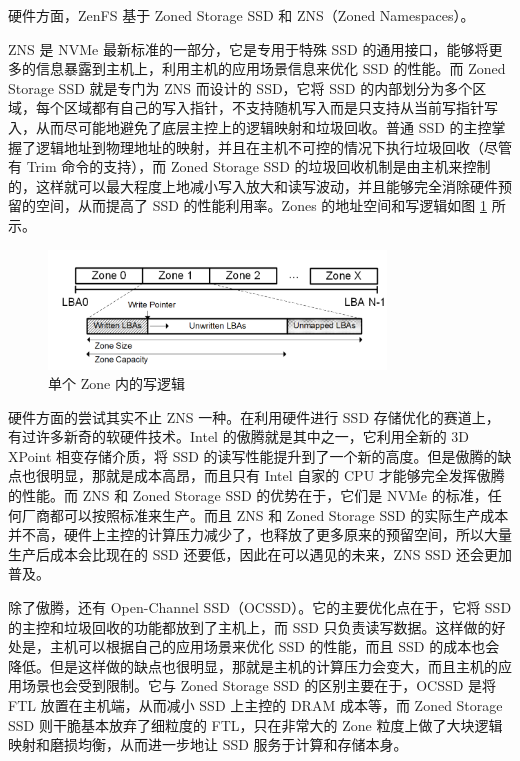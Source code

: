 硬件方面，ZenFS 基于 Zoned Storage SSD 和 ZNS（Zoned Namespaces）。

ZNS 是 NVMe 最新标准的一部分，它是专用于特殊 SSD 的通用接口，能够将更多的信息暴露到主机上，利用主机的应用场景信息来优化 SSD 的性能。而 Zoned Storage SSD 就是专门为 ZNS 而设计的 SSD，它将 SSD 的内部划分为多个区域，每个区域都有自己的写入指针，不支持随机写入而是只支持从当前写指针写入，从而尽可能地避免了底层主控上的逻辑映射和垃圾回收。普通 SSD 的主控掌握了逻辑地址到物理地址的映射，并且在主机不可控的情况下执行垃圾回收（尽管有 Trim 命令的支持），而 Zoned Storage SSD 的垃圾回收机制是由主机来控制的，这样就可以最大程度上地减小写入放大和读写波动，并且能够完全消除硬件预留的空间，从而提高了 SSD 的性能利用率。Zones 的地址空间和写逻辑如图 \ref{zns} 所示。

\begin{figure}[htbp]
    \centering
    \includegraphics[width=0.8\textwidth]{fig/zns}
    \caption{单个 Zone 内的写逻辑}
    \label{zns}
\end{figure}

硬件方面的尝试其实不止 ZNS 一种。在利用硬件进行 SSD 存储优化的赛道上，有过许多新奇的软硬件技术。Intel 的傲腾就是其中之一，它利用全新的 3D XPoint 相变存储介质，将 SSD 的读写性能提升到了一个新的高度。但是傲腾的缺点也很明显，那就是成本高昂，而且只有 Intel 自家的 CPU 才能够完全发挥傲腾的性能。而 ZNS 和 Zoned Storage SSD 的优势在于，它们是 NVMe 的标准，任何厂商都可以按照标准来生产。而且 ZNS 和 Zoned Storage SSD 的实际生产成本并不高，硬件上主控的计算压力减少了，也释放了更多原来的预留空间，所以大量生产后成本会比现在的 SSD 还要低，因此在可以遇见的未来，ZNS SSD 还会更加普及。

除了傲腾，还有 Open-Channel SSD（OCSSD）。它的主要优化点在于，它将 SSD 的主控和垃圾回收的功能都放到了主机上，而 SSD 只负责读写数据。这样做的好处是，主机可以根据自己的应用场景来优化 SSD 的性能，而且 SSD 的成本也会降低。但是这样做的缺点也很明显，那就是主机的计算压力会变大，而且主机的应用场景也会受到限制。它与 Zoned Storage SSD 的区别主要在于，OCSSD 是将 FTL 放置在主机端，从而减小 SSD 上主控的 DRAM 成本等，而 Zoned Storage SSD 则干脆基本放弃了细粒度的 FTL，只在非常大的 Zone 粒度上做了大块逻辑映射和磨损均衡，从而进一步地让 SSD 服务于计算和存储本身。

